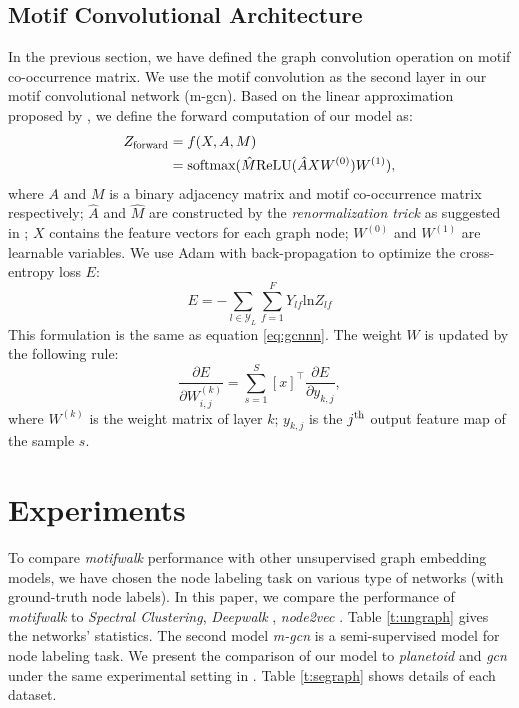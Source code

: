 \documentclass{article}
\theoremstyle{definition}
\begin{document}
\subsection{Motif Convolutional Architecture}

In the previous section, we have defined the graph convolution
operation on motif co-occurrence matrix. We use the motif convolution
as the second layer in our motif convolutional network (m-gcn). Based on the 
linear approximation proposed by \citeauthor{gcn}, we define the forward
computation of our model as:
\begin{equation} \label{eq:mforward}
    \begin{aligned}
    Z_{\scalebox{0.75}{forward}} &= f(X,A,M) \\
    &= \mbox{softmax}(\hat{M} \mbox{ReLU}(\hat{A}XW^{(0)})W^{(1)}),
    \end{aligned}
\end{equation}
where $A$ and $M$ is a binary adjacency matrix and motif co-occurrence
matrix respectively; $\hat{A}$ and $\hat{M}$ are constructed by the
\emph{renormalization trick} as suggested in \cite{gcn}; $X$ contains
the feature vectors for each graph node; $W^{(0)}$ and $W^{(1)}$ are
learnable variables. We use Adam \cite{adam} with back-propagation 
to optimize the cross-entropy loss $E$:
\begin{equation}
	E = -\sum_{l \in \mathcal{Y}_L} \sum^F_{f=1} Y_{lf}\mbox{ln} Z_{lf}
	\label{eq:mloss}
\end{equation}
This formulation is the same as equation \ref{eq:gcnnn}. The weight $W$ is updated
by the following rule:
\begin{equation}
	\frac{\partial E}{\partial W^{(k)}_{i,j}} = \sum^S_{s=1} [x]^\top \frac{\partial E}{\partial y_{k,j}},
	\label{eq:mback}
\end{equation}
where $W^{(k)}$ is the weight matrix of layer $k$; $y_{k,j}$ is the 
$j^{\scalebox{0.75}{th}}$ output feature map of the sample $s$. 

\section{Experiments}

To compare \emph{motifwalk} performance with other unsupervised graph
embedding models, we have chosen the node labeling task on various
type of networks (with ground-truth node labels). In this paper, we
compare the performance of \emph{motifwalk} to \emph{Spectral Clustering}, 
\emph{Deepwalk} \cite{deepwalk}, \emph{node2vec} \cite{node2vec}. 
Table \ref{t:ungraph} gives the networks' statistics. The second model 
\emph{m-gcn} is a semi-supervised model for node labeling task. 
We present the comparison of our model to \emph{planetoid} and
\emph{gcn} under the same experimental setting in \cite{gcn}. 
Table \ref{t:segraph} shows details of each dataset.
\end{document}
